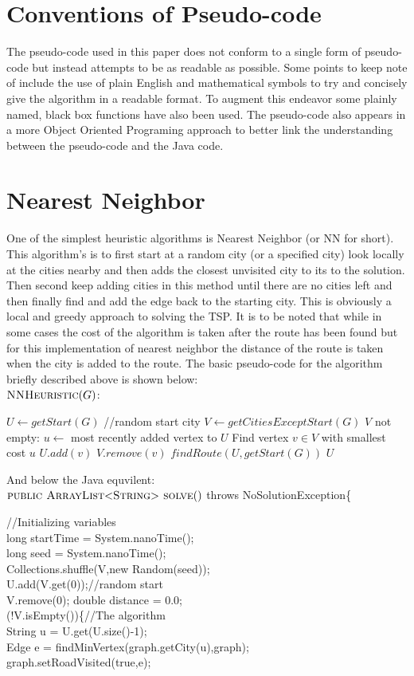 \documentclass[midd]{thesis}
\newcommand{\tab}{\hspace*{2em}}
\begin{document}
\section{Conventions of Pseudo-code}
\tab The pseudo-code used in this paper does not conform to a single form of pseudo-code but instead attempts to be as readable as possible. Some points to keep note of include the use of plain English and mathematical symbols to try and concisely give the algorithm in a readable format. To augment this endeavor some plainly named, black box functions have also been used. The pseudo-code also appears in a more Object Oriented Programing approach to better link the understanding between the pseudo-code and the Java code.
\section{Nearest Neighbor}
\tab One of the simplest heuristic algorithms is Nearest Neighbor (or NN for short). This algorithm's is to first start at a random city (or a specified city) look locally at the cities nearby and then adds the closest unvisited city to its to the solution. Then second keep adding cities in this method until there are no cities left and then finally find and add the edge back to the starting city. This is obviously a local and greedy approach to solving the TSP. It is to be noted that while in some cases the cost of the algorithm is taken after the route has been found but for this implementation of nearest neighbor the distance of the route is taken when the city is added to the route. The basic pseudo-code for the algorithm briefly described above is shown below:\\
$\textnormal{\scshape NNHeuristic}(G)$:
\begin{codebox}
\li $U \gets getStart(G)$ //random start city
\li $V \gets getCitiesExceptStart(G)$
\li\While $V$ not empty:
\li $u \gets$ most recently added vertex to $U$
\li Find vertex $v \in V$ with smallest cost $u$
\li $U.add(v)$
\li $V.remove(v)$\End
\li $findRoute(U, getStart(G))$
\li\Return $U$
\end{codebox}
And below the Java equvilent:\\
$\textnormal{\scshape public ArrayList$<$String$>$ solve}()$ throws NoSolutionException\{
\begin{codebox}
\tab//Initializing variables\\
\tab long startTime = System.nanoTime();\\
\tab long seed = System.nanoTime();\\
\tab Collections.shuffle(V,new Random(seed));\\
\tab U.add(V.get(0));//random start\\
\tab V.remove(0); double distance = 0.0;\\
\tab\While(!V.isEmpty())\{//The algorithm\\
\tab\tab String u = U.get(U.size()-1);\\
\tab\tab Edge e = findMinVertex(graph.getCity(u),graph);\\
\tab\tab graph.setRoadVisited(true,e);\\
\end{codebox}
\end{document}
